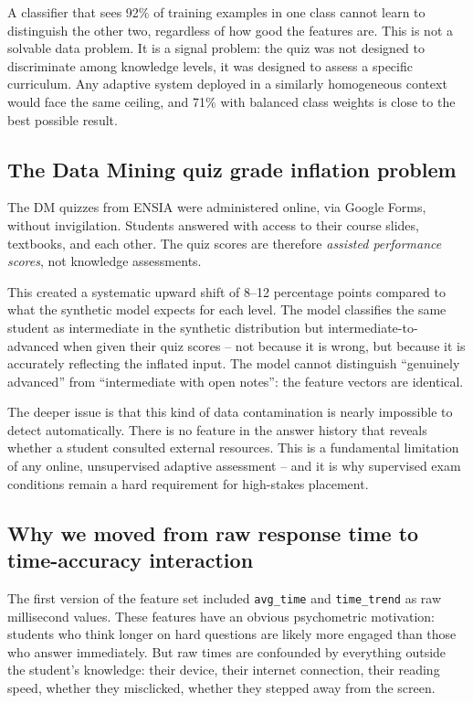 \documentclass[12pt,a4paper]{article}
\begin{document}
A classifier that sees 92\% of training examples in one class cannot learn to
distinguish the other two, regardless of how good the features are. This is not a
solvable data problem. It is a signal problem: the quiz was not designed to
discriminate among knowledge levels, it was designed to assess a specific curriculum.
Any adaptive system deployed in a similarly homogeneous context would face the same
ceiling, and 71\% with balanced class weights is close to the best possible result.

\subsection{The Data Mining quiz grade inflation problem}

The DM quizzes from ENSIA were administered online, via Google Forms, without
invigilation. Students answered with access to their course slides, textbooks, and
each other. The quiz scores are therefore \emph{assisted performance scores}, not
knowledge assessments.

This created a systematic upward shift of 8--12 percentage points compared to what
the synthetic model expects for each level. The model classifies the same student as
intermediate in the synthetic distribution but intermediate-to-advanced when given
their quiz scores -- not because it is wrong, but because it is accurately reflecting
the inflated input. The model cannot distinguish ``genuinely advanced'' from
``intermediate with open notes'': the feature vectors are identical.

The deeper issue is that this kind of data contamination is nearly impossible to
detect automatically. There is no feature in the answer history that reveals whether
a student consulted external resources. This is a fundamental limitation of any
online, unsupervised adaptive assessment -- and it is why supervised exam conditions
remain a hard requirement for high-stakes placement.

\subsection{Why we moved from raw response time to time-accuracy interaction}

The first version of the feature set included \texttt{avg\_time} and
\texttt{time\_trend} as raw millisecond values. These features have an obvious
psychometric motivation: students who think longer on hard questions are likely
more engaged than those who answer immediately. But raw times are confounded by
everything outside the student's knowledge: their device, their internet connection,
their reading speed, whether they misclicked, whether they stepped away from the
screen.
\end{document}
